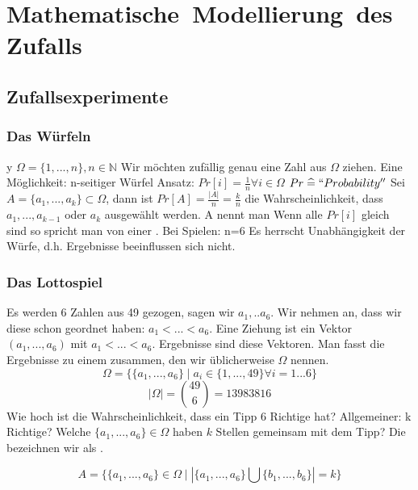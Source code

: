 
\chapter{Mathematische\ Modellierung\ des\ Zufalls}
\section{Zufallsexperimente}
\subsection{Das Würfeln}
y
$\Omega = \lbrace 1, ... , n  \rbrace , n \in \mathbb{N}$ Wir möchten zufällig genau eine Zahl aus $\Omega$ ziehen. Eine Möglichkeit: n-seitiger Würfel\newline
Ansatz: $Pr[i] = \frac{1}{n}  \forall i \in \Omega$\newline
$Pr \mathrel{\widehat{=}} ``Probability''$\newline
Sei $A=\lbrace a_1, ... , a_k \rbrace \subset \Omega$, dann ist $Pr[A]=\frac{\left|A\right|}{n} = \frac{k}{n}$ die Wahrscheinlichkeit, dass $a_1, ..., a_{k-1}$ oder $a_{k}$ ausgewählt werden.\newline
A nennt man \newline
Wenn alle $Pr[i]$ gleich sind so spricht man von einer .\newline
Bei Spielen: n=6
Es herrscht Unabhängigkeit der Würfe, d.h. Ergebnisse beeinflussen sich nicht.

\subsection{Das Lottospiel}
Es werden 6 Zahlen aus 49 gezogen, sagen wir $a_1, .. a_6$. Wir nehmen an, dass wir diese schon geordnet haben: $a_1 < ... < a_6$. Eine Ziehung ist ein Vektor $(a_1,...,a_6)$ mit $a_1 < ... < a_6$. Ergebnisse sind diese Vektoren. Man fasst die Ergebnisse zu einem  zusammen, den wir üblicherweise $\Omega$ nennen.
$$ \Omega = \lbrace \lbrace a_1,...,a_6 \rbrace \mid a_i \in \lbrace 1,...,49 \rbrace \forall i=1...6  \rbrace$$
$$ \left|\Omega\right| = \binom{49}{6} = 13983816$$%
Wie hoch ist die Wahrscheinlichkeit, dass ein Tipp 6 Richtige hat? Allgemeiner: k Richtige? %
Welche $\lbrace a_1,...,a_6 \rbrace \in \Omega$ haben $k$ Stellen gemeinsam mit dem Tipp? %
Die bezeichnen wir als .\newpage%

$$A = \lbrace \lbrace a_1,...,a_6 \rbrace \in \Omega \mid \left| \lbrace a_1,...,a_6 \rbrace \bigcup \lbrace b_1,...,b_6 \rbrace \right| = k \rbrace$$%

